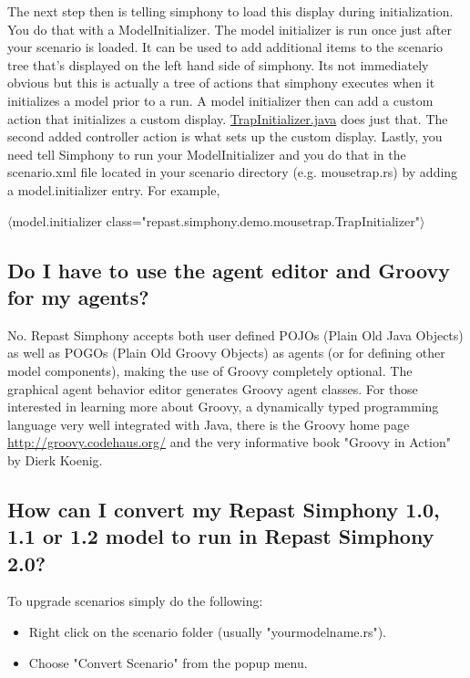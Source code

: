 \documentclass[11pt]{article}
\begin{document}
The next step then is telling simphony to load this display during initialization. You do that with a ModelInitializer. The model initializer is run once just after your scenario is loaded. It can be used to add additional items to the scenario tree that's displayed on the left hand side of simphony. Its not immediately obvious but this is actually a tree of actions that simphony executes when it initializes a model prior to a run. A model initializer then can add a custom action that initializes a custom display.  \href{http://repast.sourceforge.net/docs/TrapInitializer.java}{TrapInitializer.java} does just that. The second added controller action is what sets up the custom display. Lastly, you need tell Simphony to run your ModelInitializer and you do that in the scenario.xml file located in your scenario directory (e.g. mousetrap.rs) by adding a model.initializer entry. For example,

$\langle$model.initializer class="repast.simphony.demo.mousetrap.TrapInitializer"$\rangle$

\subsection{Do I have to use the agent editor and Groovy for my agents?}
\label{prs:ae_groovy}

No. Repast Simphony accepts both user defined POJOs (Plain Old Java Objects) as well as POGOs (Plain Old Groovy Objects) as agents (or for defining other model components), making the use of Groovy completely optional. The graphical agent behavior editor generates Groovy agent classes. For those interested in learning more about Groovy, a dynamically typed programming language very well integrated with Java, there is the Groovy home page \url{http://groovy.codehaus.org/} and the very informative book "Groovy in Action" by Dierk Koenig.

\subsection{How can I convert my Repast Simphony 1.0, 1.1 or 1.2 model to run in Repast Simphony 2.0?}
\label{prs:convert}

To upgrade scenarios simply do the following:

\begin{itemize}
\item Right click on the scenario folder (usually "yourmodelname.rs").
\item Choose "Convert Scenario" from the popup menu.
\end{itemize}
\end{document}
